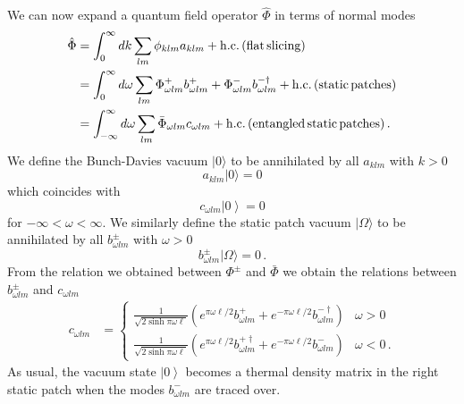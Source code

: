 \documentclass{brownthesis}
\begin{document}
We can now expand a quantum field operator $\hat{\Phi}$ in terms
of normal modes
\begin{align*}
\hat{\Phi} & =\int_{0}^{\infty}dk\sum_{lm}\phi_{klm}a_{klm}+{\rm h.c.\,(flat\,slicing)}\\
 & =\int_{0}^{\infty}d\omega\sum_{lm}\Phi_{\omega lm}^{+}b_{\omega lm}^{+}+\Phi_{\omega lm}^{{\rm -}}b_{\omega lm}^{{\rm -}\dagger}+{\rm h.c.\,(static\,patches)}\\
 & =\int_{-\infty}^{\infty}d\omega\sum_{lm}\bar{\Phi}_{\omega lm}c_{\omega lm}+{\rm h.c.\,(entangled\,static\,patches)}\,.
\end{align*}
We define the Bunch-Davies vacuum $|0\rangle$ to be annihilated by
all $a_{klm}$ with $k>0$
\[
a_{klm}|0\rangle=0
\]
which coincides with
\[
c_{\omega lm}\left|0\right\rangle =0
\]
for $-\infty<\omega<\infty$. We similarly define the static patch
vacuum $|\Omega\rangle$ to be annihilated by all $b_{\omega lm}^{\pm}$
with $\omega>0$
\[
b_{\omega lm}^{\pm}|\Omega\rangle=0\,.
\]
From the relation we obtained between $\Phi^{\pm}$ and $\bar{\Phi}$
we obtain the relations between $b_{\omega lm}^{\pm}$ and $c_{\omega lm}$
\begin{align*}
c_{\omega lm} & =\begin{cases}
\frac{1}{\sqrt{2\sinh{\pi\omega\ell}}}\left(e^{\pi\omega\ell/2}b_{\omega lm}^{+}+e^{-\pi\omega\ell/2}b_{\omega lm}^{-\dagger}\right) & \omega>0\\
\frac{1}{\sqrt{2\sinh{\pi\omega\ell}}}\left(e^{\pi\omega\ell/2}b_{\omega lm}^{+\dagger}+e^{-\pi\omega\ell/2}b_{\omega lm}^{-}\right) & \omega<0\,.
\end{cases}
\end{align*}
As usual, the vacuum state $\left|0\right\rangle $ becomes a thermal
density matrix in the right static patch when the modes $b_{\omega lm}^{-}$
are traced over.
\end{document}
